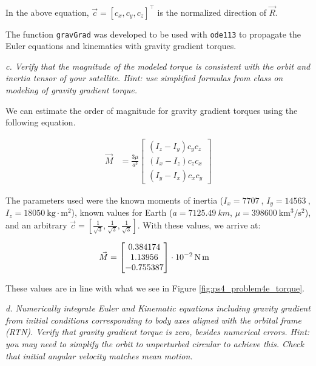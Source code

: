 In the above equation, $\Vec{c} = [c_x, c_y, c_z]^\intercal$ is the normalized direction of $\Vec{R}$.

The function \texttt{gravGrad} was developed to be used with \texttt{ode113} to propagate the Euler equations and kinematics with gravity gradient torques.




\textit{c. Verify that the magnitude of the modeled torque is consistent with the orbit and inertia tensor of your satellite. Hint: use simplified formulas from class on modeling of gravity gradient torque.}

We can estimate the order of magnitude for gravity gradient torques using the following equation.

\begin{align*}
    \Vec{M} &= \frac{3 \mu}{a^3}
    \begin{bmatrix}
    (I_z - I_y) c_y c_z \\
    (I_x - I_z) c_z c_x \\
    (I_y - I_x) c_x c_y
    \end{bmatrix}
\end{align*}

The parameters used were the known moments of inertia ($I_x = \qty{7707}{}$, $I_y = \qty{14563}{}$, $I_z = \qty{18050}{\kilogram\cdot\meter^2}$), known values for Earth ($a = \qty{7125.49}{km}$, $\mu = \qty{398600}{\km^3\per\second^2}$), and an arbitrary $\Vec{c} = [\frac{1}{\sqrt{3}}, \frac{1}{\sqrt{3}}, \frac{1}{\sqrt{3}}]$. With these values, we arrive at:

\begin{align*}
    \Vec{M} &=
\qty[parse-numbers = false]{
    \begin{bmatrix}
    0.384174 \\
    1.13956 \\
    -0.755387
    \end{bmatrix}
    \cdot
    10^{-2}
}{\newton\meter}
\end{align*}

These values are in line with what we see in Figure \ref{fig:ps4_problem4e_torque}.

\newpage
\textit{d. Numerically integrate Euler and Kinematic equations including gravity gradient from initial conditions corresponding to body axes aligned with the orbital frame (RTN). Verify that gravity gradient torque is zero, besides numerical errors. Hint: you may need to simplify the orbit to unperturbed circular to achieve this. Check that initial angular velocity matches mean motion.}

